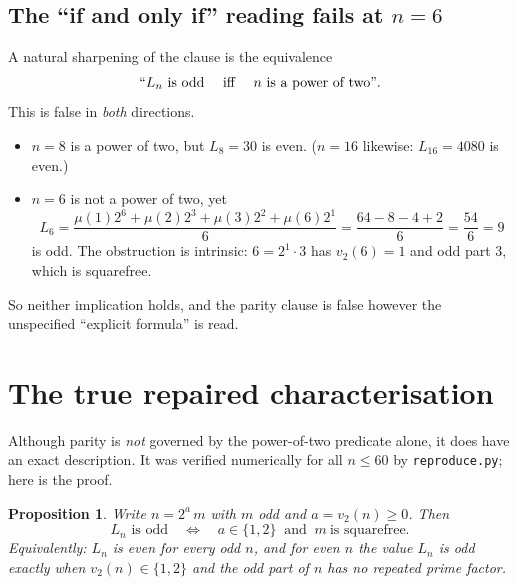 \documentclass[11pt]{article}
\newtheorem{proposition}[theorem]{Proposition}
\theoremstyle{definition}
\theoremstyle{remark}
\newcommand{\vtwo}{v_2}
\begin{document}
\subsection{The ``if and only if'' reading fails at $n = 6$}

A natural sharpening of the clause is the equivalence
\[
  \text{``$L_n$ is odd \quad iff \quad $n$ is a power of two''}.
\]
This is false in \emph{both} directions.
\begin{itemize}
\item $n = 8$ is a power of two, but $L_8 = 30$ is even. ($n = 16$ likewise:
$L_{16} = 4080$ is even.)
\item $n = 6$ is not a power of two, yet
\[
  L_6 = \frac{\mu(1)2^6 + \mu(2)2^3 + \mu(3)2^2 + \mu(6)2^1}{6}
      = \frac{64 - 8 - 4 + 2}{6} = \frac{54}{6} = 9
\]
is odd. The obstruction is intrinsic: $6 = 2^1 \cdot 3$ has $v_2(6) = 1$ and
odd part $3$, which is squarefree.
\end{itemize}
So neither implication holds, and the parity clause is false however the
unspecified ``explicit formula'' is read.

\section{The true repaired characterisation}

Although parity is \emph{not} governed by the power-of-two predicate alone, it
does have an exact description. It was verified numerically for all $n \le 60$
by \texttt{reproduce.py}; here is the proof.

\begin{proposition}\label{prop:repaired}
Write $n = 2^{a}\,m$ with $m$ odd and $a = \vtwo(n) \ge 0$. Then
\[
  L_n \text{ is odd}
  \quad\Longleftrightarrow\quad
  a \in \{1,2\} \ \text{ and }\ m \ \text{is squarefree}.
\]
Equivalently: $L_n$ is even for every odd $n$, and for even $n$ the value
$L_n$ is odd exactly when $\vtwo(n) \in \{1,2\}$ and the odd part of $n$ has no
repeated prime factor.
\end{proposition}
\end{document}

